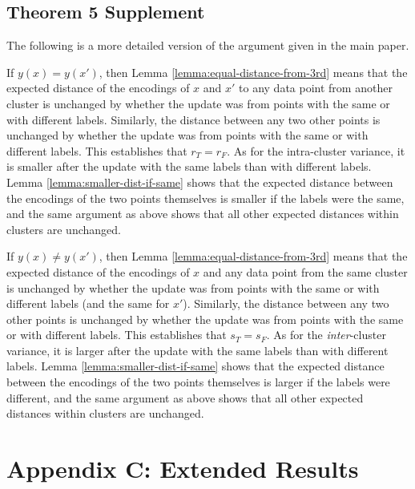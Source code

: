 \documentclass[runningheads]{llncs}
\begin{document}
\subsection{Theorem 5 Supplement}
The following is a more detailed version of the argument given in the main paper.

If $y(x) = y(x')$, then Lemma \ref{lemma:equal-distance-from-3rd} means that the expected distance of the encodings of $x$ and $x'$ to any data point from another cluster is unchanged by whether the update was from points with the same or with different labels. Similarly, the distance between any two other points is unchanged by whether the update was from points with the same or with different labels. This establishes that $r_T = r_F$. As for the intra-cluster variance, it is smaller after the update with the same labels than with different labels. Lemma \ref{lemma:smaller-dist-if-same} shows that the expected distance between the encodings of the two points themselves is smaller if the labels were the same, and the same argument as above shows that all other expected distances within clusters are unchanged.

If $y(x) \neq y(x')$, then Lemma \ref{lemma:equal-distance-from-3rd} means that the expected distance of the encodings of $x$ and any data point from the same cluster is unchanged by whether the update was from points with the same or with different labels (and the same for $x'$). Similarly, the distance between any two other points is unchanged by whether the update was from points with the same or with different labels. This establishes that $s_T = s_F$. As for the \emph{inter}-cluster variance, it is larger after the update with the same labels than with different labels. Lemma \ref{lemma:smaller-dist-if-same} shows that the expected distance between the encodings of the two points themselves is larger if the labels were different, and the same argument as above shows that all other expected distances within clusters are unchanged.

 
\section{Appendix C: Extended Results} \label{app:extended-results}
\end{document}

